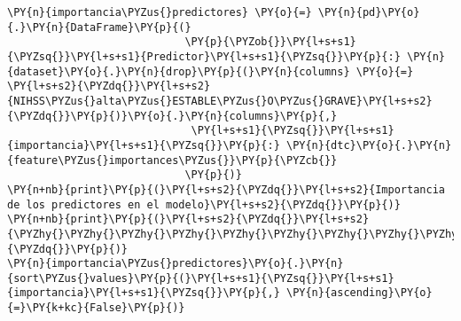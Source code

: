    \begin{tcolorbox}[breakable, size=fbox, boxrule=1pt, pad at break*=1mm,colback=cellbackground, colframe=cellborder]
\begin{Verbatim}[commandchars=\\\{\}]
\PY{n}{importancia\PYZus{}predictores} \PY{o}{=} \PY{n}{pd}\PY{o}{.}\PY{n}{DataFrame}\PY{p}{(}
                            \PY{p}{\PYZob{}}\PY{l+s+s1}{\PYZsq{}}\PY{l+s+s1}{Predictor}\PY{l+s+s1}{\PYZsq{}}\PY{p}{:} \PY{n}{dataset}\PY{o}{.}\PY{n}{drop}\PY{p}{(}\PY{n}{columns} \PY{o}{=} \PY{l+s+s2}{\PYZdq{}}\PY{l+s+s2}{NIHSS\PYZus{}alta\PYZus{}ESTABLE\PYZus{}O\PYZus{}GRAVE}\PY{l+s+s2}{\PYZdq{}}\PY{p}{)}\PY{o}{.}\PY{n}{columns}\PY{p}{,}
                             \PY{l+s+s1}{\PYZsq{}}\PY{l+s+s1}{importancia}\PY{l+s+s1}{\PYZsq{}}\PY{p}{:} \PY{n}{dtc}\PY{o}{.}\PY{n}{feature\PYZus{}importances\PYZus{}}\PY{p}{\PYZcb{}}
                            \PY{p}{)}
\PY{n+nb}{print}\PY{p}{(}\PY{l+s+s2}{\PYZdq{}}\PY{l+s+s2}{Importancia de los predictores en el modelo}\PY{l+s+s2}{\PYZdq{}}\PY{p}{)}
\PY{n+nb}{print}\PY{p}{(}\PY{l+s+s2}{\PYZdq{}}\PY{l+s+s2}{\PYZhy{}\PYZhy{}\PYZhy{}\PYZhy{}\PYZhy{}\PYZhy{}\PYZhy{}\PYZhy{}\PYZhy{}\PYZhy{}\PYZhy{}\PYZhy{}\PYZhy{}\PYZhy{}\PYZhy{}\PYZhy{}\PYZhy{}\PYZhy{}\PYZhy{}\PYZhy{}\PYZhy{}\PYZhy{}\PYZhy{}\PYZhy{}\PYZhy{}\PYZhy{}\PYZhy{}\PYZhy{}\PYZhy{}\PYZhy{}\PYZhy{}\PYZhy{}\PYZhy{}\PYZhy{}\PYZhy{}\PYZhy{}\PYZhy{}\PYZhy{}\PYZhy{}\PYZhy{}\PYZhy{}\PYZhy{}\PYZhy{}}\PY{l+s+s2}{\PYZdq{}}\PY{p}{)}
\PY{n}{importancia\PYZus{}predictores}\PY{o}{.}\PY{n}{sort\PYZus{}values}\PY{p}{(}\PY{l+s+s1}{\PYZsq{}}\PY{l+s+s1}{importancia}\PY{l+s+s1}{\PYZsq{}}\PY{p}{,} \PY{n}{ascending}\PY{o}{=}\PY{k+kc}{False}\PY{p}{)}
\end{Verbatim}
\end{tcolorbox}

